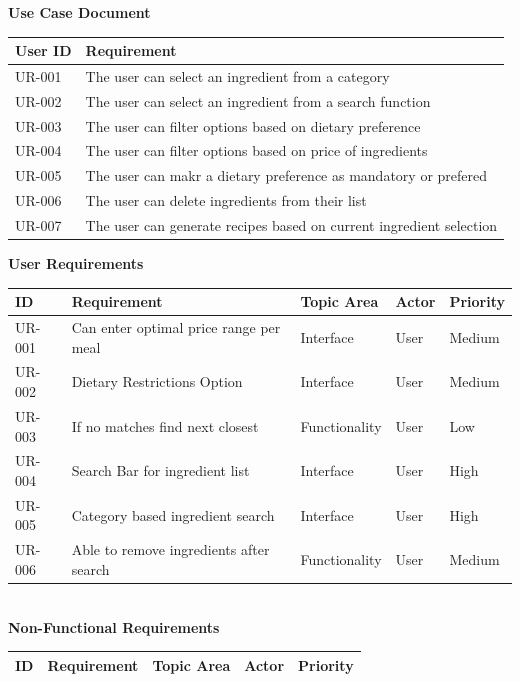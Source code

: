 \documentclass[12pt]{article}
\begin{document}
\begin{center}
\begin{center}
  \textbf{Use Case Document}
  \begin{tabular}{ l | l }
    \textbf{User ID} & \textbf{Requirement} \\ \hline \rowcolor[gray]{.95}
    UR-001 & The user can select an ingredient from a category \\ 
    UR-002 & The user can select an ingredient from a search function \\ \rowcolor[gray]{.95}
    UR-003 & The user can filter options based on dietary preference \\ 
    UR-004 & The user can filter options based on price of ingredients \\ \rowcolor[gray]{.95}
    UR-005 & The user can makr a dietary preference as mandatory or prefered \\
    UR-006 & The user can delete ingredients from their list \\ \rowcolor[gray]{.95}
    UR-007 & The user can generate recipes based on current ingredient selection \\ \hline
  \end{tabular}
\end{center}
 \textbf{User Requirements} \\
\begin{tabular}{| l | l | l | l | l | }
  \hline
  \textbf{ID}  & \textbf{Requirement} & \textbf{Topic Area} & \textbf{Actor} & \textbf{Priority} \\ \hline
  UR-001 & Can enter optimal price range per meal & Interface & User & Medium \\ \hline 
  UR-002 & Dietary Restrictions Option  & Interface & User & Medium \\ \hline
  UR-003 & If no matches find next closest & Functionality & User & Low \\ \hline
  UR-004 & Search Bar for ingredient list & Interface & User & High \\ \hline
  UR-005 & Category based ingredient search & Interface & User & High \\ \hline
  UR-006 & Able to remove ingredients after search & Functionality & User & Medium \\ \hline
\end{tabular}
\\
  \vspace{1cm}
  \textbf{Non-Functional Requirements}
\begin{tabular}{| l | l | l | l | l | }
  \hline
  \textbf{ID}  & \textbf{Requirement} & \textbf{Topic Area} & \textbf{Actor} & \textbf{Priority} \\ \hline

\end{tabular}
\end{center}
\end{document}
